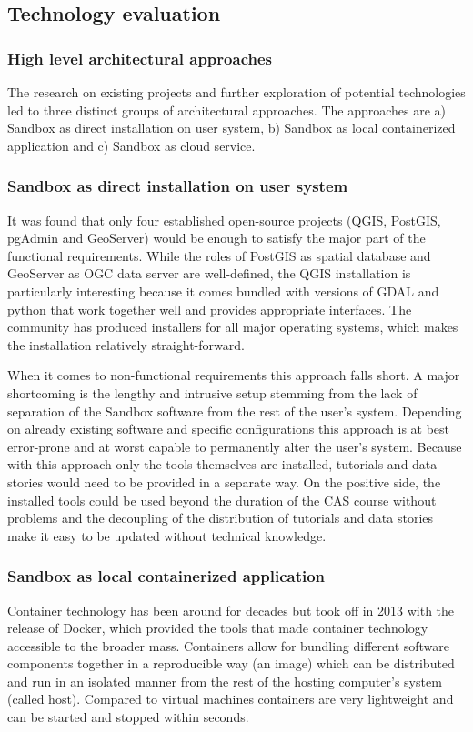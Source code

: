 \documentclass[11pt, a4paper, oneside, parskip=full-]{scrartcl}
\begin{document}
\subsection{Technology evaluation}

\subsubsection{High level architectural approaches}
The research on existing projects and further exploration of potential
technologies led to three distinct groups of architectural approaches. The
approaches are a) Sandbox as direct installation on user system, b) Sandbox as
local containerized application and c) Sandbox as cloud service.

\subsubsection*{Sandbox as direct installation on user system}
It was found that only four established open-source projects (QGIS, PostGIS,
pgAdmin\cite{pgadmin} and GeoServer\cite{geoserver}) would be enough to satisfy
the major part of the functional requirements. While the roles of PostGIS as
spatial database and GeoServer as OGC data server are well-defined, the QGIS
installation is particularly interesting because it comes bundled with versions
of GDAL and python that work together well and provides appropriate interfaces.
The community has produced installers for all major operating systems, which
makes the installation relatively straight-forward.

When it comes to non-functional requirements this approach falls short. A major
shortcoming is the lengthy and intrusive setup stemming from the lack of
separation of the Sandbox software from the rest of the user's system. Depending
on already existing software and specific configurations this approach is at
best error-prone and at worst capable to permanently alter the user's system.
Because with this approach only the tools themselves are installed, tutorials
and data stories would need to be provided in a separate way. On the positive
side, the installed tools could be used beyond the duration of the CAS course
without problems and the decoupling of the distribution of tutorials and data
stories make it easy to be updated without technical knowledge.

\subsubsection*{Sandbox as local containerized application}
Container technology has been around for decades but took off in 2013 with the
release of Docker, which provided the tools that made container technology
accessible to the broader mass. Containers allow for bundling different software
components together in a reproducible way (an image) which can be distributed
and run in an isolated manner from the rest of the hosting computer's system
(called host). Compared to virtual machines containers are very lightweight and
can be started and stopped within seconds.
\end{document}
